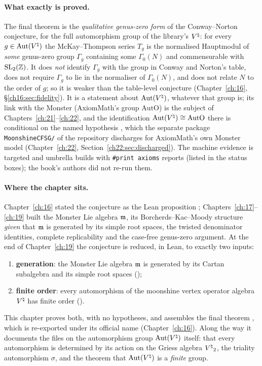 \paragraph{What exactly is proved.}  The final theorem is the \emph{qualitative genus-zero form} of the Conway--Norton
conjecture, for the full automorphism group of the library's ${V^{\natural}}$: for every $g\in\operatorname{Aut}({V^{\natural}})$ the McKay--Thompson
series $T_g$ is the normalised Hauptmodul of \emph{some} genus-zero group $\Gamma_g$ containing some $\Gamma_0(N)$ and
commensurable with $\mathrm{SL}_2({\mathbb{Z}})$.  It does \emph{not} identify $\Gamma_g$ with the group in Conway and Norton's
table, does not require $\Gamma_g$ to lie in the normaliser of $\Gamma_0(N)$, and does not relate $N$ to the order of $g$;
so it is weaker than the table-level conjecture (Chapter~\ref{ch:16}, \S\ref{ch16:sec:fidelity}).  It is a statement about
$\operatorname{Aut}({V^{\natural}})$, whatever that group is; its link with the Monster (AxiomMath's group $\mathrm{AutO}$) is the subject of
Chapters~\ref{ch:21}--\ref{ch:22}, and the identification $\operatorname{Aut}({V^{\natural}})\cong\mathrm{AutO}$ there is conditional on the
named hypothesis , which the separate package \texttt{MoonshineCFSG/} of the repository discharges
for AxiomMath's own Monster model (Chapter~\ref{ch:22},
Section~\ref{ch22:sec:discharged}).  The machine evidence is targeted and umbrella builds with \texttt{\#print axioms}
reports (listed in the status boxes); the book's authors did not re-run them.

\paragraph{Where the chapter sits.}  Chapter~\ref{ch:16} stated the
conjecture as the Lean proposition ; Chapters~\ref{ch:17}--\ref{ch:19} built the Monster
Lie algebra $\mathfrak m$, its Borcherds--Kac--Moody structure \emph{given} that $\mathfrak m$ is generated by its
simple root spaces, the twisted denominator identities, complete replicability and the case-free genus-zero
argument.  At the end of Chapter~\ref{ch:19} the conjecture is reduced, in Lean, to exactly two inputs:
\begin{enumerate}[label=(\Roman*)]
\item \textbf{generation}: the Monster Lie algebra $\mathfrak m$ is generated by its Cartan subalgebra and its
  simple root spaces ();
\item \textbf{finite order}: every automorphism of the moonshine vertex operator algebra ${V^{\natural}}$ has finite order
  ().
\end{enumerate}
This chapter proves both, with no hypotheses, and assembles the final theorem
, which is re-exported under its official name
 (Chapter~\ref{ch:16}).  Along the way it documents the files on the
automorphism group $\operatorname{Aut}({V^{\natural}})$ itself: that every automorphism is determined by its action on the Griess
algebra ${V^{\natural}}_2$, the triality automorphism $\sigma$, and the theorem that $\operatorname{Aut}({V^{\natural}})$ is a \emph{finite} group.

